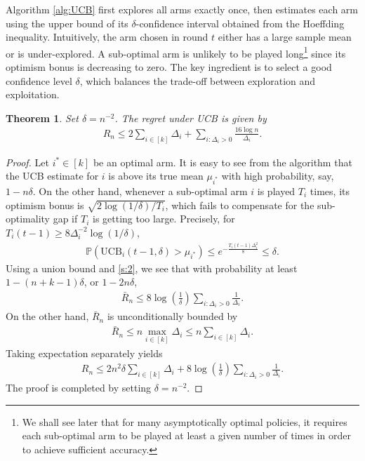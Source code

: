\documentclass[letterpaper,11pt,openright,openany]{book}
\numberwithin{equation}{section}
\theoremstyle{plain}
\newtheorem{Th}{Theorem}[section]
\theoremstyle{definition}
\def\P{{\mathbb P}}
\begin{document}
Algorithm \ref{alg:UCB} first explores all arms exactly once, then estimates each arm using the upper bound of its $\delta$-confidence interval obtained from the Hoeffding inequality. Intuitively, the arm chosen in round $t$ either has a large sample mean or is under-explored. A sub-optimal arm is unlikely to be played long\footnote{We shall see later that for many asymptotically optimal policies, it requires each sub-optimal arm to be played at least a given number of times in order to achieve sufficient accuracy. } since its optimism bonus is decreasing to zero. The key ingredient is to select a good confidence level $\delta$, which balances the trade-off between exploration and exploitation.  
\begin{Th}\label{thm:UCB}
Set $\delta=n^{-2}$. The regret under UCB is given by
\begin{align*}
R_n\leq 2\sum_{i\in [k]}\Delta_i +\sum_{i: \Delta_i>0}\frac{16\log n}{\Delta_i}.
\end{align*}
\end{Th}


\begin{proof}
Let $i^*\in [k]$ be an optimal arm. It is easy to see from the algorithm that the UCB estimate for $i$ is above its true mean $\mu_{i^*}$ with high probability, say, $1-n\delta$. On the other hand, whenever a sub-optimal arm $i$ is played $T_i$ times, its optimism bonus is $\sqrt{2\log(1/\delta)/T_i}$, which fails to compensate for the sub-optimality gap if $T_i$ is getting too large. Precisely, for $T_i(t-1)\geq 8\Delta_i^{-2}\log(1/\delta)$,
\begin{align*}
\P\left(\text{UCB}_i(t-1, \delta)>\mu_{i^*}\right)\leq e^{-\frac{T_i(t-1)\Delta_i^2}{8}}\leq\delta. 
\end{align*}
Using a union bound and \eqref{s:2}, we see that with probability at least $1-(n+k-1)\delta$, or $1-2n\delta$,  
\begin{align*}
\bar{R}_n\leq 8\log\left(\frac{1}{\delta}\right)\sum_{i: \Delta_i>0}\frac{1}{\Delta_i}. 
\end{align*}
On the other hand, $\bar{R}_n$ is unconditionally bounded by 
\begin{align*}
\bar{R}_n\leq n\max_{i\in [k]}\Delta_i\leq n\sum_{i\in [k]}\Delta_i. 
\end{align*}
Taking expectation separately yields
\begin{align*}
R_n\leq 2n^2\delta\sum_{i\in [k]}\Delta_i+8\log\left(\frac{1}{\delta}\right)\sum_{i: \Delta_i>0}\frac{1}{\Delta_i}. 
\end{align*}
The proof is completed by setting $\delta = n^{-2}$.  
\end{proof}
\end{document}

